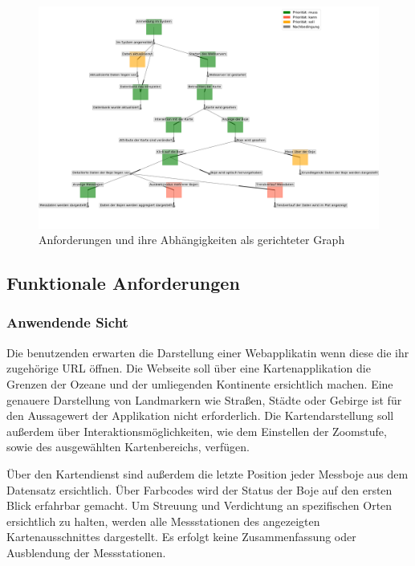     \begin{figure}[h!]
    \centering
    \includegraphics[width=\textwidth]{pix/graph_anforderungen.png}
    \caption{Anforderungen und ihre Abhängigkeiten als gerichteter Graph}
    \label{fig:graph_anforderungen}
    \end{figure}
    
     
    \subsection{Funktionale Anforderungen}
    
    \subsubsection{Anwendende Sicht}
    
    Die benutzenden erwarten die Darstellung einer Webapplikatin wenn diese die ihr zugehörige URL öffnen. Die Webseite soll über eine Kartenapplikation die Grenzen der Ozeane und der umliegenden Kontinente ersichtlich machen.  Eine genauere Darstellung von Landmarkern wie Straßen, Städte oder Gebirge ist für den Aussagewert der Applikation nicht erforderlich. Die Kartendarstellung soll außerdem über Interaktionsmöglichkeiten, wie dem Einstellen der Zoomstufe, sowie des ausgewählten Kartenbereichs, verfügen.
    
    Über den Kartendienst sind außerdem die letzte Position jeder Messboje aus dem Datensatz ersichtlich. Über Farbcodes wird der Status der Boje auf den ersten Blick erfahrbar gemacht. Um Streuung und Verdichtung an spezifischen Orten ersichtlich zu halten, werden alle Messstationen des angezeigten Kartenausschnittes dargestellt. Es erfolgt keine Zusammenfassung oder Ausblendung der Messstationen.
    
